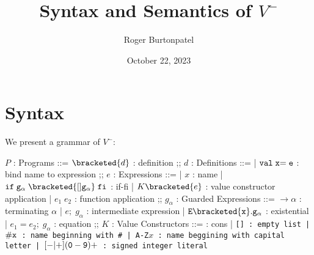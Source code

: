 \documentclass[]{article}
\title{Syntax and Semantics of $V^{-}$}
\author{Roger Burtonpatel}
\date{October 22, 2023}
\begin{document}
\maketitle

\section{Syntax}

We present a grammar of $V^{-}$: 

\bigskip
\newcommand\galpha{\ensuremath{g_{\alpha}}}


\begin{center}
    \begin{bnf}

    $P$ : \textsf{Programs} ::=
    $\bracketed{d}$ : definition
    ;;
    $d$ : \textsf{Definitions} ::=
    | $\tt{val} \; x  \tt{=} \; e$ : bind name to expression
    ;;
    $e$ : \textsf{Expressions} ::=
    | $x$ : name
    | $\tt{if} \; \galpha \; \bracketed{[] \galpha} \; \tt{fi}$ : if-fi 
    | $K \bracketed{e}$ : value constructor application 
    | $e_1 \; e_2$ : function application 
    ;;
    $\galpha$ : \textsf{Guarded Expressions} ::=  
    $\boldsymbol{\rightarrow}\alpha$ : terminating $\alpha$ 
    | $e; \; \galpha$ : intermediate expression 
    | $\tt{E} \bracketed{x} \tt{.} \galpha$ : existential 
    | $e_1 = e_2; \; \galpha$ : equation 
    ;;
    $K$ : \textsf{Value Constructors} ::=
    \cons : cons 
    | \tt{[]} : empty list 
    | $\tt{\#}x$ : name beginning with \tt{\#}
    | \tt{A-Z}$x$ : name beggining with capital letter
    | $[\tt{-}\vert\tt{+}](\tt{0}-\tt{9})+$ : signed integer literal 

    \end{bnf}
\end{center}

\bigskip 
\end{document}
